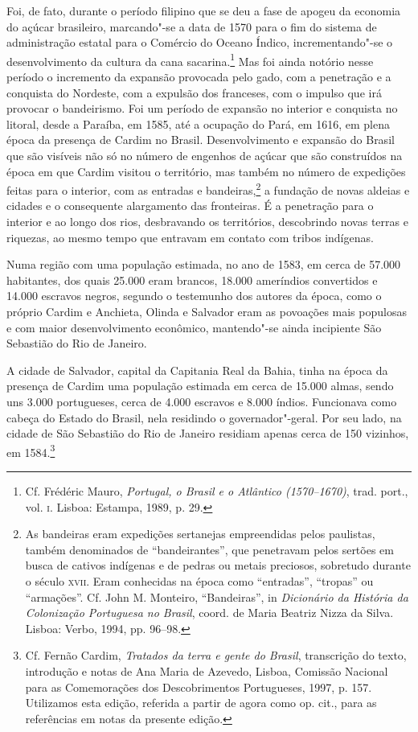 Foi, de fato, durante o período filipino que se deu a fase de
apogeu da economia do açúcar brasileiro, marcando"-se a data de 1570
para o fim do sistema de administração estatal para o Comércio do
Oceano Índico, incrementando"-se o desenvolvimento da cultura da cana
sacarina.\footnote{ Cf. Frédéric Mauro, \textit{Portugal, o
Brasil e o Atlântico (1570--1670)}, trad. port., vol. \textsc{i}. Lisboa:
Estampa, 1989, p. 29.} Mas foi ainda notório nesse período o
incremento da expansão provocada pelo gado, com a penetração e a
conquista do Nordeste, com a expulsão dos franceses, com o impulso que
irá provocar o bandeirismo. Foi um período de expansão no interior e
conquista no litoral, desde a Paraíba, em 1585, até a ocupação do Pará,
em 1616, em plena época da presença de Cardim no Brasil. 
Desenvolvimento e expansão do Brasil que são visíveis não só no número
de engenhos de açúcar que são construídos na época em que Cardim
visitou o território, mas também no número de expedições feitas para o
interior, com as entradas e bandeiras,\footnote{ As bandeiras eram
expedições sertanejas empreendidas pelos paulistas, também denominados
de ``bandeirantes'', que penetravam pelos sertões em busca de cativos
indígenas e de pedras ou metais preciosos, sobretudo durante o século
\textsc{xvii}. Eram conhecidas na época como ``entradas'', ``tropas'' ou ``armações''.
Cf. John M. Monteiro, ``Bandeiras'', in \textit{Dicionário da História
da Colonização Portuguesa no Brasil}, coord. de Maria Beatriz Nizza da
Silva. Lisboa: Verbo, 1994, pp. 96--98.} a fundação de novas aldeias e
cidades e o consequente alargamento das fronteiras. É a penetração para
o interior e ao longo dos rios, desbravando os territórios, descobrindo
novas terras e riquezas, ao mesmo tempo que entravam em contato com tribos indígenas. 

Numa região com uma população estimada, no ano de 1583, em cerca de
57.000 habitantes, dos quais 25.000 eram brancos, 18.000 ameríndios
convertidos e 14.000 escravos negros, segundo o testemunho dos autores
da época, como o próprio Cardim e Anchieta, Olinda e Salvador eram as
povoações mais populosas e com maior desenvolvimento econômico,
mantendo"-se ainda incipiente São Sebastião do Rio de Janeiro.

A cidade de Salvador, capital da Capitania Real da Bahia, tinha na
época da presença de Cardim uma população estimada em cerca de 15.000
almas, sendo uns 3.000 portugueses, cerca de 4.000 escravos e 8.000
índios. Funcionava como cabeça do Estado do Brasil, nela residindo o
governador"-geral. Por seu lado, na cidade de São Sebastião do Rio de
Janeiro residiam apenas cerca de 150 vizinhos, em 1584.\footnote{ Cf. Fernão Cardim, 
\textit{Tratados da terra e gente do Brasil}, transcrição do texto, introdução e notas de 
Ana Maria de Azevedo, Lisboa, Comissão Nacional para as Comemorações dos Descobrimentos Portugueses, 
1997, p. 157. Utilizamos esta edição, referida a partir de agora como op. cit., 
para as referências em notas da presente edição.}

